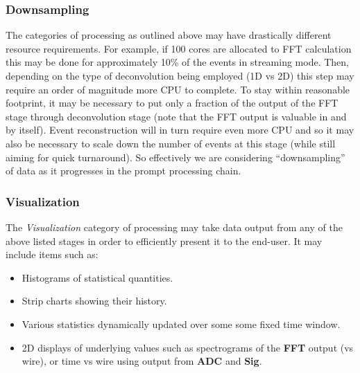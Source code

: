\documentclass[pdftex,12pt,letter]{article}
\begin{document}
\subsubsection{Downsampling}
\label{sec:downsampling}
The categories of processing as outlined above may have drastically different resource requirements.
For example, if 100 cores are allocated to FFT calculation this may be done for approximately 10\% of the events
in streaming mode. Then, depending on the type of deconvolution being employed (1D vs 2D) this step
may require an order of magnitude more CPU to complete. To stay within reasonable footprint,
it may be necessary to put only a fraction of the output of the FFT stage through deconvolution stage
(note that the FFT output is valuable in and by itself). Event reconstruction will in turn require even more CPU
and so it may also be necessary to scale down the number of
events at this stage (while still aiming for quick turnaround). So effectively we are considering ``downsampling''
of data as it progresses in the prompt processing chain.



\subsubsection{Visualization}
\label{sec:viz_intro}

The \textit{Visualization} category of processing
 may take data output from any of the above listed stages in
order to efficiently present it to the end-user. 
It may include items such as:

\begin{itemize}

\item Histograms of statistical quantities.

\item Strip charts showing their history.

\item Various statistics dynamically updated over some some fixed time window.

\item 2D displays of underlying values such as spectrograms of the \textbf{FFT}
  output (vs wire), or time vs wire using output from \textbf{ADC} and \textbf{Sig}.

\end{itemize}
\end{document}
